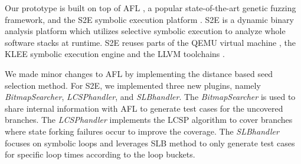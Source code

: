 Our prototype is built on top of AFL \cite{online:afl}, a popular 
state-of-the-art genetic fuzzing framework, and the S2E symbolic 
execution platform \cite{chipounov2011s2e}. S2E is a dynamic 
binary analysis platform which utilizes selective symbolic execution 
to analyze whole software stacks at runtime. S2E reuses parts of 
the QEMU virtual machine \cite{bellard2005qemu}, the KLEE symbolic 
execution engine \cite{cadar2008klee} and the LLVM 
toolchains \cite{lattner2004llvm}.

We made minor changes to AFL by implementing the distance based seed 
selection method. For S2E, we implemented three new plugins, namely 
\textit{BitmapSearcher}, \textit{LCSPhandler}, and \textit{SLBhandler}. 
The \textit{BitmapSearcher} is used to share internal information with 
AFL to generate test cases for the uncovered branches. The \textit{LCSPhandler} 
implements the LCSP algorithm to cover branches where state forking 
failures occur to improve the coverage. The \textit{SLBhandler} focuses 
on symbolic loops and leverages SLB method to only generate test cases 
for specific loop times according to the loop buckets. 
